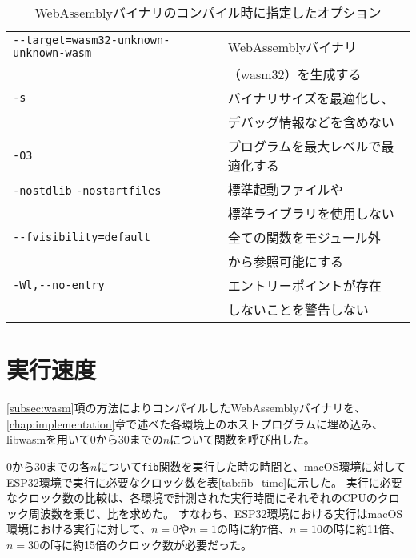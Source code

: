 \begin{table}[htbp]
  \label{tab:compiler}
  \caption{WebAssemblyバイナリのコンパイル時に指定したオプション}
  \begin{center}
    \begin{tabular}{ll}
    \hline
    \verb|--target=wasm32-unknown-unknown-wasm| & WebAssemblyバイナリ \\
    & （wasm32）を生成する \\ \hline
    \verb|-s| & バイナリサイズを最適化し、 \\
    & デバッグ情報などを含めない \\ \hline
    \verb|-O3| & プログラムを最大レベルで最適化する \\ \hline
    \verb|-nostdlib| \verb|-nostartfiles| & 標準起動ファイルや\\
    & 標準ライブラリを使用しない \\ \hline
    \verb|--fvisibility=default| & 全ての関数をモジュール外 \\
    & から参照可能にする \\ \hline
    \verb|-Wl,--no-entry| & エントリーポイントが存在 \\
    & しないことを警告しない \\ \hline
    \end{tabular}
  \end{center}
\end{table}

\newpage

\section{実行速度}

\ref{subsec:wasm}項の方法によりコンパイルしたWebAssemblyバイナリを、\ref{chap:implementation}章で述べた各環境上のホストプログラムに埋め込み、libwasmを用いて0から30までの$n$について関数を呼び出した。

0から30までの各$n$について\verb|fib|関数を実行した時の時間と、macOS環境に対してESP32環境で実行に必要なクロック数を表\ref{tab:fib_time}に示した。
実行に必要なクロック数の比較は、各環境で計測された実行時間にそれぞれのCPUのクロック周波数を乗じ、比を求めた。
すなわち、ESP32環境における実行はmacOS環境における実行に対して、$n=0$や$n=1$の時に約7倍、$n=10$の時に約11倍、$n=30$の時に約15倍のクロック数が必要だった。

